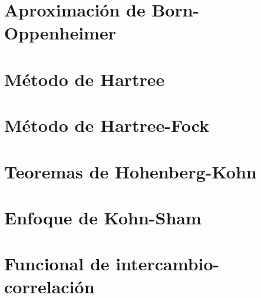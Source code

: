 
\section{Aproximaci\'on de Born-Oppenheimer}



\section{M\'etodo de Hartree}



\section{M\'etodo de Hartree-Fock}



\section{Teoremas de Hohenberg-Kohn}



\section{Enfoque de Kohn-Sham}



\section{Funcional de intercambio-correlaci\'on}



